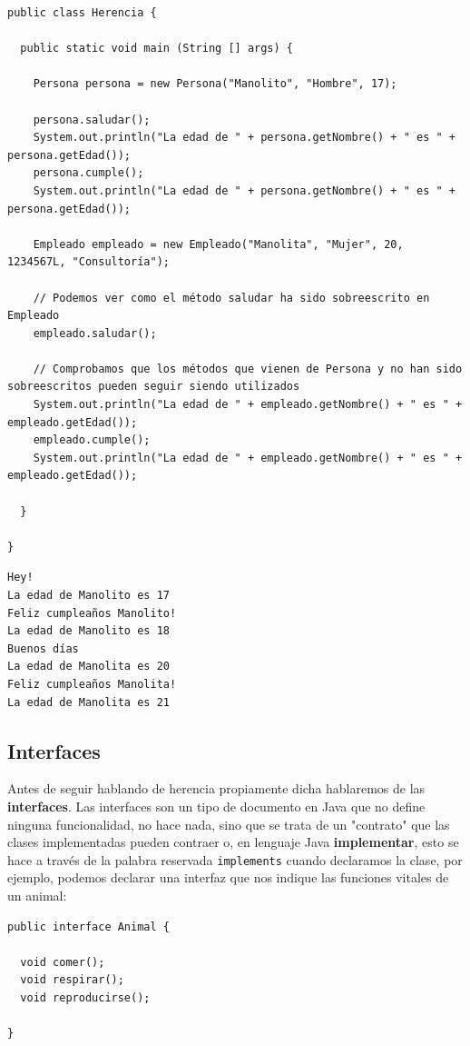 \documentclass[11pt]{article}
\begin{document}
\begin{verbatim}
public class Herencia {

  public static void main (String [] args) {

    Persona persona = new Persona("Manolito", "Hombre", 17);

    persona.saludar();
    System.out.println("La edad de " + persona.getNombre() + " es " + persona.getEdad());
    persona.cumple();
    System.out.println("La edad de " + persona.getNombre() + " es " + persona.getEdad());

    Empleado empleado = new Empleado("Manolita", "Mujer", 20, 1234567L, "Consultoría");

    // Podemos ver como el método saludar ha sido sobreescrito en Empleado
    empleado.saludar();

    // Comprobamos que los métodos que vienen de Persona y no han sido sobreescritos pueden seguir siendo utilizados
    System.out.println("La edad de " + empleado.getNombre() + " es " + empleado.getEdad());
    empleado.cumple();
    System.out.println("La edad de " + empleado.getNombre() + " es " + empleado.getEdad());

  }

}
\end{verbatim}

\begin{verbatim}
Hey!
La edad de Manolito es 17
Feliz cumpleaños Manolito!
La edad de Manolito es 18
Buenos días
La edad de Manolita es 20
Feliz cumpleaños Manolita!
La edad de Manolita es 21
\end{verbatim}

\subsection{Interfaces}
\label{sec:orgdaf1fad}
Antes de seguir hablando de herencia propiamente dicha hablaremos de las \textbf{interfaces}. Las interfaces son un tipo de documento en Java que no define ninguna funcionalidad, no hace nada, sino que se trata de un "contrato" que las clases implementadas pueden contraer o, en lenguaje Java \textbf{implementar}, esto se hace a través de la palabra reservada \texttt{implements} cuando declaramos la clase, por ejemplo, podemos declarar una interfaz que nos indique las funciones vitales de un animal:

\begin{verbatim}
public interface Animal {

  void comer();
  void respirar();
  void reproducirse();

}
\end{verbatim}
\end{document}
